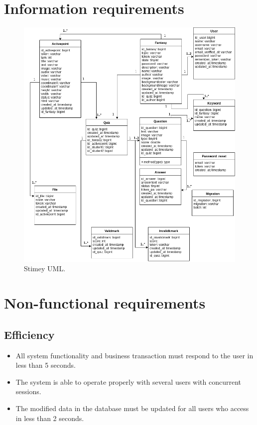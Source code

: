 \section{Information requirements}
\begin{figure}[h]
	\centering
	\includegraphics[scale=0.5]{Developing/StimeyUML.png}
	\caption{Stimey UML.}
	\label{Stimey UML}
\end{figure}


\section{Non-functional requirements}
\subsection{Efficiency}

\begin{itemize}

	\item All system functionality and business transaction must respond to the user in less than 5 seconds.
	\item The system is able to operate properly with several users with concurrent sessions.
	\item The modified data in the database must be updated for all users who access in less than 2 seconds.
\end{itemize}


